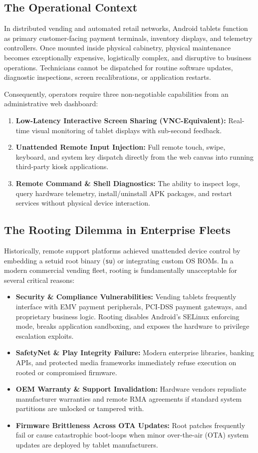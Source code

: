 \documentclass[11pt,a4paper]{article}
\begin{document}
\subsection{The Operational Context}
In distributed vending and automated retail networks, Android tablets function as primary customer-facing payment terminals, inventory displays, and telemetry controllers. Once mounted inside physical cabinetry, physical maintenance becomes exceptionally expensive, logistically complex, and disruptive to business operations. Technicians cannot be dispatched for routine software updates, diagnostic inspections, screen recalibrations, or application restarts.

Consequently, operators require three non-negotiable capabilities from an administrative web dashboard:
\begin{enumerate}[leftmargin=*]
    \item \textbf{Low-Latency Interactive Screen Sharing (VNC-Equivalent):} Real-time visual monitoring of tablet displays with sub-second feedback.
    \item \textbf{Unattended Remote Input Injection:} Full remote touch, swipe, keyboard, and system key dispatch directly from the web canvas into running third-party kiosk applications.
    \item \textbf{Remote Command \& Shell Diagnostics:} The ability to inspect logs, query hardware telemetry, install/uninstall APK packages, and restart services without physical device interaction.
\end{enumerate}

\subsection{The Rooting Dilemma in Enterprise Fleets}
Historically, remote support platforms achieved unattended device control by embedding a setuid root binary (\texttt{su}) or integrating custom OS ROMs. In a modern commercial vending fleet, rooting is fundamentally unacceptable for several critical reasons:
\begin{itemize}[leftmargin=*]
    \item \textbf{Security \& Compliance Vulnerabilities:} Vending tablets frequently interface with EMV payment peripherals, PCI-DSS payment gateways, and proprietary business logic. Rooting disables Android's SELinux enforcing mode, breaks application sandboxing, and exposes the hardware to privilege escalation exploits.
    \item \textbf{SafetyNet \& Play Integrity Failure:} Modern enterprise libraries, banking APIs, and protected media frameworks immediately refuse execution on rooted or compromised firmware.
    \item \textbf{OEM Warranty \& Support Invalidation:} Hardware vendors repudiate manufacturer warranties and remote RMA agreements if standard system partitions are unlocked or tampered with.
    \item \textbf{Firmware Brittleness Across OTA Updates:} Root patches frequently fail or cause catastrophic boot-loops when minor over-the-air (OTA) system updates are deployed by tablet manufacturers.
\end{itemize}
\end{document}

